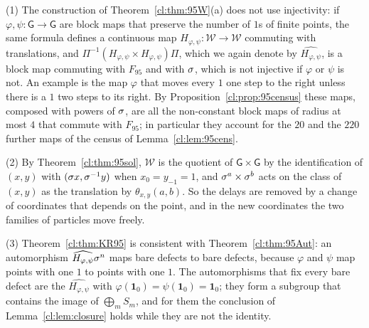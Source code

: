 \begin{remark}\label{cl:rem:95end}
(1) The construction of Theorem~\ref{cl:thm:95W}(a) does not use injectivity: if $\varphi,\psi\colon \mathsf G\to \mathsf G$ are block maps that preserve the number of $1$s of finite points, the same formula defines a continuous map $H_{\varphi,\psi}\colon\mathcal W\to\mathcal W$ commuting with translations, and $\Pi^{-1}(H_{\varphi,\psi}\times H_{\varphi,\psi})\Pi$, which we again denote by $\widehat{H_{\varphi,\psi}}$, is a block map commuting with $F_{95}$ and with $\sigma$, which is not injective if $\varphi$ or $\psi$ is not. An example is the map $\varphi$ that moves every $1$ one step to the right unless there is a $1$ two steps to its right. By Proposition~\ref{cl:prop:95census} these maps, composed with powers of $\sigma$, are all the non-constant block maps of radius at most $4$ that commute with $F_{95}$; in particular they account for the $20$ and the $220$ further maps of the census of Lemma~\ref{cl:lem:95cens}.

(2) By Theorem~\ref{cl:thm:95sol}, $\mathcal W$ is the quotient of $\mathsf G\times\mathsf G$ by the identification of $(x,y)$ with $(\sigma x,\sigma^{-1}y)$ when $x_0=y_{-1}=1$, and $\sigma^a\times\sigma^b$ acts on the class of $(x,y)$ as the translation by $\theta_{x,y}(a,b)$. So the delays are removed by a change of coordinates that depends on the point, and in the new coordinates the two families of particles move freely.

(3) Theorem~\ref{cl:thm:KR95} is consistent with Theorem~\ref{cl:thm:95Aut}: an automorphism $\widehat{H_{\varphi,\psi}}\sigma^n$ maps bare defects to bare defects, because $\varphi$ and $\psi$ map points with one $1$ to points with one $1$. The automorphisms that fix every bare defect are the $\widehat{H_{\varphi,\psi}}$ with $\varphi(\mathbf 1_0)=\psi(\mathbf 1_0)=\mathbf 1_0$; they form a subgroup that contains the image of $\bigoplus_mS_m$, and for them the conclusion of Lemma~\ref{cl:lem:closure} holds while they are not the identity.
\end{remark}

